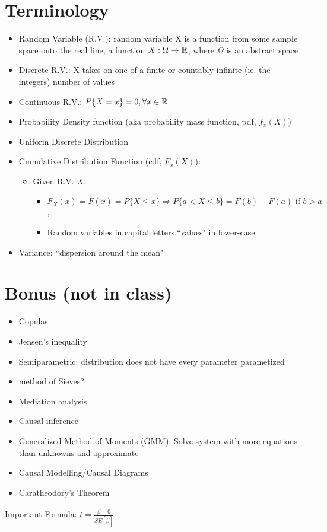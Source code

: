 
\section{Terminology}
\begin{itemize}
    \item Random Variable (R.V.): random variable X is a function from some sample space onto the real line; a function $X: \Omega \rightarrow \mathbb{R}$, where $\Omega$ is an abstract space
    \item Discrete R.V.: X takes on one of a finite or countably infinite (ie. the integers) number of values
    \item Continuous R.V.: $P\{X=x\}=0, \forall x \in \mathbb{R}$
    \item Probability Density function (aka probability mass function, pdf, $f_x(X)$)
    \item Uniform Discrete Distribution
    \item Cumulative Distribution Function (cdf, $F_x(X)$): 
    \begin{itemize}
        \item Given R.V. $X$, 
        \begin{itemize}
            \item $F_X(x) = F(x)=P\{X\leq x\}\Rightarrow P\{a<X\leq b\}=F(b)-F(a) \text{ if } b> a$, 
            \item Random variables in capital letters,``values" in lower-case
        \end{itemize}
        
    \end{itemize}
    \item Variance: ``dispersion around the mean"
\end{itemize}


\section{Bonus (not in class)}
\begin{itemize}
    \item Copulas
    \item Jensen's inequality
    \item Semiparametric: distribution does not have every parameter parametized
    \item method of Sieves?
    \item Mediation analysis
    \item Causal inference
    \item Generalized Method of Moments (GMM): Solve system with more equations than unknowns and approximate
    \item Causal Modelling/Causal Diagrams
    \item Caratheodory's Theorem
\end{itemize}

Important Formula: $t=\frac{\hat \beta -0}{SE[\hat \beta]}$
